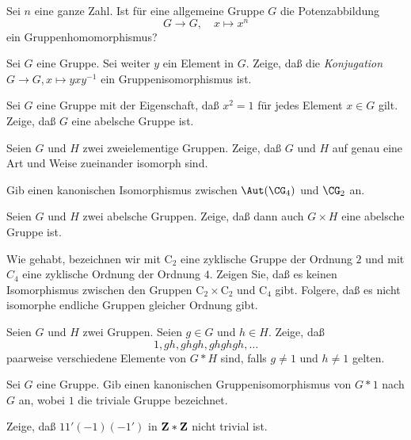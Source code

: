 \documentclass{algsheet}
\begin{document}
\begin{exercise}
    Sei \(n\) eine ganze Zahl. Ist für eine allgemeine Gruppe \(G\) die
    Potenzabbildung
    \begin{equation}
        G \to G,\quad x \mapsto x^n
    \end{equation}
    ein Gruppenhomomorphismus?
\end{exercise}

\begin{exercise}
    Sei \(G\) eine Gruppe. Sei weiter \(y\) ein Element in \(G\). Zeige, daß
    die \emph{Konjugation} \(G \to G, x \mapsto y x y^{-1}\) ein
    Gruppenisomorphismus ist.
\end{exercise}

\begin{exercise}
    Sei \(G\) eine Gruppe mit der Eigenschaft, daß \(x^2 = 1\) für jedes
    Element \(x \in G\) gilt. Zeige, daß \(G\) eine abelsche Gruppe ist.
\end{exercise}

\begin{exercise}
    Seien \(G\) und \(H\) zwei zweielementige Gruppen. Zeige, daß \(G\) und
    \(H\) auf genau eine Art und Weise zueinander isomorph sind.
\end{exercise}

\begin{exercise}
    Gib einen kanonischen Isomorphismus zwischen \(\Aut(\CG_4)\) und \(\CG_2\)
    an.
\end{exercise}

\begin{exercise}
    Seien \(G\) und \(H\) zwei abelsche Gruppen. Zeige, daß dann auch
    \(G \times H\) eine abelsche Gruppe ist.
\end{exercise}

\begin{exercise}
    Wie gehabt, bezeichnen wir mit \(\mathrm C_2\) eine zyklische Gruppe der Ordnung
    \(2\) und mit \(C_4\) eine zyklische Ordnung der Ordnung \(4\). Zeigen Sie,
    daß es keinen Isomorphismus zwischen den Gruppen \(\mathrm C_2 \times\mathrm C_2\) und 
    \(\mathrm C_4\) gibt. Folgere, daß es nicht isomorphe endliche Gruppen gleicher
    Ordnung gibt.
\end{exercise}

\begin{exercise}
    Seien \(G\) und \(H\) zwei Gruppen. Seien \(g \in G\) und \(h \in H\).
    Zeige, daß
    \begin{equation}
        1, g h, g h g h, g h g h g h, \dotsc
    \end{equation}
    paarweise verschiedene Elemente von \(G \ast H\) sind, falls \(g \neq 1\)
    und \(h \neq 1\) gelten.
\end{exercise}

\begin{exercise}
    Sei \(G\) eine Gruppe. Gib einen kanonischen Gruppenisomorphismus von
    \(G \ast 1\) nach \(G\) an, wobei \(1\) die triviale Gruppe bezeichnet.
\end{exercise}

\begin{exercise}
    Zeige, daß \(1 1' (-1) (-1')\) in \(\mathbf Z \ast \mathbf Z\) nicht trivial ist.
\end{exercise}
\end{document}
